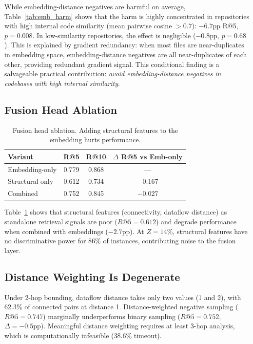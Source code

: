 \documentclass[11pt]{article}
\begin{document}
While embedding-distance negatives are harmful on average, Table~\ref{tab:emb_harm} shows that the harm is highly concentrated in repositories with high internal code similarity (mean pairwise cosine $> 0.7$): $-6.7$pp R@5, $p = 0.008$. In low-similarity repositories, the effect is negligible ($-0.8$pp, $p = 0.68$). This is explained by gradient redundancy: when most files are near-duplicates in embedding space, embedding-distance negatives are all near-duplicates of each other, providing redundant gradient signal. This conditional finding is a salvageable practical contribution: \emph{avoid embedding-distance negatives in codebases with high internal similarity}.

\subsection{Fusion Head Ablation}

\begin{table}[t]
\centering
\caption{Fusion head ablation. Adding structural features to the embedding hurts performance.}
\label{tab:fusion}
\begin{tabular}{lccc}
\toprule
\textbf{Variant} & \textbf{R@5} & \textbf{R@10} & \textbf{$\Delta$ R@5 vs Emb-only} \\
\midrule
Embedding-only     & 0.779 & 0.868 & --- \\
Structural-only    & 0.612 & 0.734 & $-0.167$ \\
Combined           & 0.752 & 0.845 & $-0.027$ \\
\bottomrule
\end{tabular}
\end{table}

Table~\ref{tab:fusion} shows that structural features (connectivity, dataflow distance) as standalone retrieval signals are poor ($R@5 = 0.612$) and degrade performance when combined with embeddings ($-2.7$pp). At $Z = 14\%$, structural features have no discriminative power for 86\% of instances, contributing noise to the fusion layer.

\subsection{Distance Weighting Is Degenerate}

Under 2-hop bounding, dataflow distance takes only two values (1 and 2), with 62.3\% of connected pairs at distance 1. Distance-weighted negative sampling ($R@5 = 0.747$) marginally underperforms binary sampling ($R@5 = 0.752$, $\Delta = -0.5$pp). Meaningful distance weighting requires at least 3-hop analysis, which is computationally infeasible (38.6\% timeout).
\end{document}
